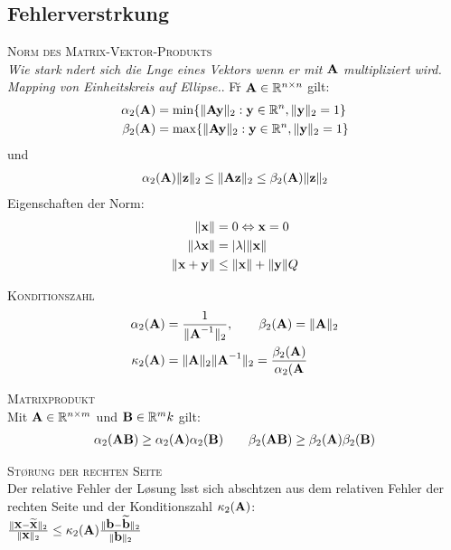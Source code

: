 \subsection{Fehlerverst\a rkung}
\textsc{Norm des Matrix-Vektor-Produkts}\\
\emph{Wie stark \a ndert sich die L\a nge eines Vektors wenn er mit $\mbox{\bf A}$ multipliziert wird. Mapping von Einheitskreis auf Ellipse.}.
F\u r $\mbox{\bf A} \in \mathbb{R}^{n \times n}$ gilt:
\begin{align*}
\alpha_2(\mbox{\bf A}) &= \min\{\Vert \mbox{\bf Ay} \Vert_2 : \mbox{\bf y}\in\mathbb{R}^{n}, \Vert \mbox{\bf y} \Vert_2 =1 \} \\
\beta_2(\mbox{\bf A}) &= \max\{\Vert \mbox{\bf Ay} \Vert_2 : \mbox{\bf y}\in\mathbb{R}^{n}, \Vert \mbox{\bf y} \Vert_2 =1 \} 
\end{align*}
und
\begin{align*}
\alpha_2(\mbox{\bf A})\Vert \mbox{\bf z} \Vert_2 \leq \Vert \mbox{\bf Az} \Vert_2 \leq \beta_2(\mbox{\bf A})\Vert \mbox{\bf z} \Vert_2
\end{align*}
Eigenschaften der Norm:
\begin{align*}
\Vert \mbox{\bf x} \Vert &= 0 \Leftrightarrow \mbox{\bf x} = 0 \\
\Vert \lambda \mbox{\bf x} \Vert &= | \lambda | \Vert \mbox{\bf x} \Vert \\
\Vert \mbox{\bf x} + \mbox{\bf y} \Vert &\leq \Vert \mbox{\bf x} \Vert+\Vert \mbox{\bf y} \Vert
Q\end{align*}

\textsc{Konditionszahl}
\begin{align*}
\alpha_2(\mbox{\bf A})&=\frac{1}{\Vert \mbox{\bf A}^{-1} \Vert_2}, \qquad \beta_2(\mbox{\bf A})=\Vert \mbox{\bf A}\Vert_2 \\
\kappa_2(\mbox{\bf A}) &= \Vert \mbox{\bf A} \Vert_2 \Vert \mbox{\bf A}^{-1} \Vert_2 = \frac{\beta_2(\mbox{\bf A})}{\alpha_2(\mbox{\bf A}}
\end{align*}

\textsc{Matrixprodukt}\\
Mit $\mbox{\bf A} \in \mathbb{R}^{n \times m}$ und $\mbox{\bf B} \in \mathbb{R}^{m}{k}$ gilt:
\begin{align*}
\alpha_2(\mbox{\bf AB}) \geq \alpha_2(\mbox{\bf A})\alpha_2(\mbox{\bf B}) \qquad \beta_2(\mbox{\bf AB}) \geq \beta_2(\mbox{\bf A})\beta_2(\mbox{\bf B})
\end{align*}

\textsc{St\o rung der rechten Seite}\\
Der relative Fehler der L\o sung l\a sst sich absch\a tzen aus dem relativen Fehler der rechten Seite und der Konditionszahl $\kappa_2(\mbox{\bf A})$: \\ $\frac{\Vert \mbox{\bf x} - \widetilde{\mbox{\bf x}} \Vert_2}{\Vert \mbox{\bf x} \Vert_2} \leq \kappa_2(\mbox{\bf A}) \frac{\Vert \mbox{\bf b}-\widetilde{\mbox{\bf b}}\Vert_2}{\Vert \mbox{\bf b}\Vert_2}$

